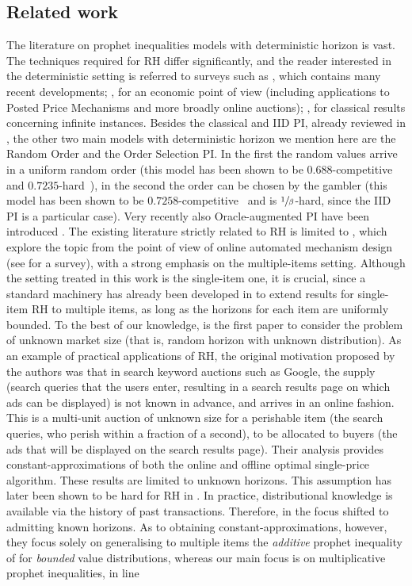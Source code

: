 \documentclass[11pt, a4paper, twoside]{article}
\numberwithin{equation}{section}
\begin{document}
	\subsection{Related work}\label{related}
	The literature on prophet inequalities models with deterministic horizon is vast. The techniques required for RH differ significantly, and the reader interested in the deterministic setting is referred to surveys such as \cite{Correa18}, which contains many recent developments; \cite{Lucier17,Correa19}, for an economic point of view (including applications to Posted Price Mechanisms and more broadly online auctions); \cite{HillKertz92}, for classical results concerning infinite instances. Besides the classical and IID PI, already reviewed in , the other two main models with deterministic horizon we mention here are the Random Order and the Order Selection PI. In the first the random values arrive in a uniform random order (this model has been shown to be $0.688$-competitive~\cite{ChenHuangLiTang24} and $0.7235$-hard~\cite{Giam23}), in the second the order can be chosen by the gambler (this model has been shown to be $0.7258$-competitive~\cite{BubChip23} and is $\sfrac{1}{\beta}$-hard, since the IID PI is a particular case). Very recently also Oracle-augmented PI have been introduced \cite{HarHarbLiv24}. The existing literature strictly related to RH is limited to \cite{AliBanGolMunWan20, HajKleSan07,MahSab06}, which explore the topic from the point of view of online automated mechanism design (see \cite{Sand03} for a survey), with a strong emphasis on the multiple-items setting. Although the setting treated in this work is the single-item one, it is crucial, since a standard machinery has already been developed in \cite{AliBanGolMunWan20} to extend results for single-item RH to multiple items, as long as the horizons for each item are uniformly bounded. To the best of our knowledge, \cite{MahSab06} is the first paper to consider the problem of unknown market size (that is, random horizon with unknown distribution). As an example of practical applications of RH, the original motivation proposed by the authors was that in search keyword auctions such as Google, the supply (search queries that the users enter, resulting in a search results page on which ads can be displayed) is not known in advance, and arrives in an online fashion. This is a multi-unit auction of unknown size for a perishable item (the search queries, who perish within a fraction of a second), to be allocated to buyers (the ads that will be displayed on the search results page). Their analysis provides constant-approximations of both the online and offline optimal single-price algorithm. These results are limited to unknown horizons. This assumption has later been shown to be hard for RH in \cite{HajKleSan07}. In practice, distributional knowledge is available via the history of past transactions. Therefore, in \cite{HajKleSan07} the focus shifted to admitting known horizons. As to obtaining constant-approximations, however, they focus solely on generalising to multiple items the \textit{additive} prophet inequality of \cite{HillKertz83} for \textit{bounded} value distributions, whereas our main focus is on multiplicative prophet inequalities, in line 
\end{document}
